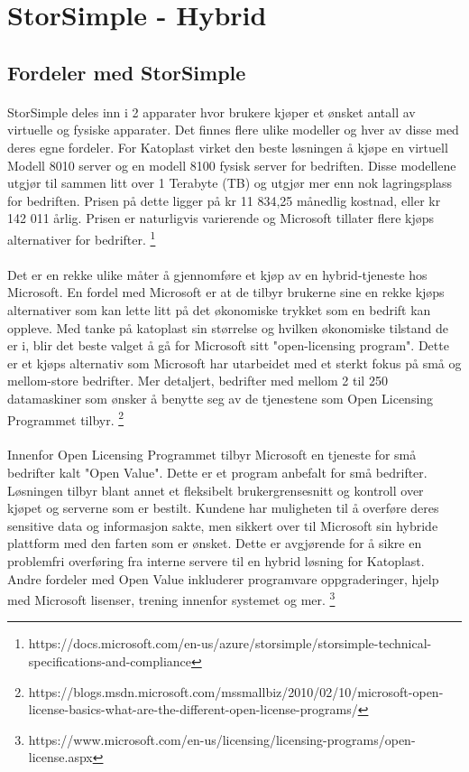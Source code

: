 \section{StorSimple - Hybrid}
\subsection{Fordeler med StorSimple}
\paragraph{} StorSimple deles inn i 2 apparater hvor brukere kjøper et ønsket antall av virtuelle og fysiske apparater. Det finnes flere ulike modeller og hver av disse med deres egne fordeler. For Katoplast virket den beste løsningen å kjøpe en virtuell Modell 8010 server og en modell 8100 fysisk server for bedriften. Disse modellene utgjør til sammen litt over 1 Terabyte (TB) og utgjør mer enn nok lagringsplass for bedriften. Prisen på dette ligger på kr 11 834,25 månedlig kostnad, eller kr 142 011 årlig. Prisen er naturligvis varierende og Microsoft tillater flere kjøps alternativer for bedrifter.
\footnote{https://docs.microsoft.com/en-us/azure/storsimple/storsimple-technical-specifications-and-compliance}

\paragraph{} Det er en rekke ulike måter å gjennomføre et kjøp av en hybrid-tjeneste hos Microsoft. En fordel med Microsoft er at de tilbyr brukerne sine en rekke kjøps alternativer som kan lette litt på det økonomiske trykket som en bedrift kan oppleve. Med tanke på katoplast sin størrelse og hvilken økonomiske tilstand de er i, blir det beste valget å gå for Microsoft sitt "open-licensing program". Dette er et kjøps alternativ som Microsoft har utarbeidet med et sterkt fokus på små og mellom-store bedrifter. Mer detaljert, bedrifter med mellom 2 til 250 datamaskiner som ønsker å benytte seg av de tjenestene som Open Licensing Programmet tilbyr. 
\footnote{https://blogs.msdn.microsoft.com/mssmallbiz/2010/02/10/microsoft-open-license-basics-what-are-the-different-open-license-programs/}

\paragraph{} Innenfor Open Licensing Programmet tilbyr Microsoft en tjeneste for små bedrifter kalt "Open Value". Dette er et program anbefalt for små bedrifter. Løsningen tilbyr blant annet et fleksibelt brukergrensesnitt og kontroll over kjøpet og serverne som er bestilt. Kundene har muligheten til å overføre deres sensitive data og informasjon sakte, men sikkert over til Microsoft sin hybride plattform med den farten som er ønsket. Dette er avgjørende for å sikre en problemfri overføring fra interne servere til en hybrid løsning for Katoplast. Andre fordeler med Open Value inkluderer programvare oppgraderinger, hjelp med Microsoft lisenser, trening innenfor systemet og mer.
\footnote{https://www.microsoft.com/en-us/licensing/licensing-programs/open-license.aspx}


